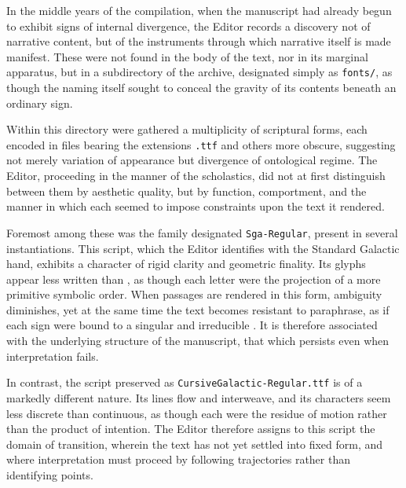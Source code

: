 {\AmiriFont
In the middle years of the compilation, when the manuscript had already begun
to exhibit signs of internal divergence, the Editor records a discovery not
of narrative content, but of the instruments through which narrative itself
is made manifest. These were not found in the body of the text, nor in its
marginal apparatus, but in a subdirectory of the archive, designated simply
as \texttt{fonts/}, as though the naming itself sought to conceal the gravity
of its contents beneath an ordinary sign.

\medskip

Within this directory were gathered a multiplicity of scriptural forms, each
encoded in files bearing the extensions \texttt{.ttf} and others more obscure,
suggesting not merely variation of appearance but divergence of ontological
regime. The Editor, proceeding in the manner of the scholastics, did not at
first distinguish between them by aesthetic quality, but by function,
comportment, and the manner in which each seemed to impose constraints upon
the text it rendered.

\medskip

Foremost among these was the family designated \texttt{Sga-Regular}, present
in several instantiations. This script, which the Editor identifies with the
Standard Galactic hand, exhibits a character of rigid clarity and geometric
finality. Its glyphs appear less written than , as though each
letter were the projection of a more primitive symbolic order. When passages
are rendered in this form, ambiguity diminishes, yet at the same time the text
becomes resistant to paraphrase, as if each sign were bound to a singular and
irreducible . It is therefore associated with the underlying
structure of the manuscript, that which persists even when interpretation
fails.

\medskip

In contrast, the script preserved as \texttt{CursiveGalactic-Regular.ttf} is
of a markedly different nature. Its lines flow and interweave, and its
characters seem less discrete than continuous, as though each were the residue
of motion rather than the product of intention.  The Editor therefore assigns to this script the domain of
transition, wherein the text has not yet settled into fixed form, and where
interpretation must proceed by following trajectories rather than identifying
points.

}
